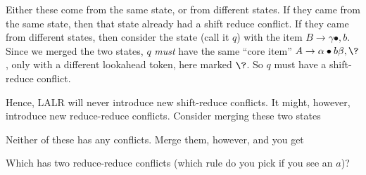 \begin{center}
\end{center}

Either these come from the same state, or from different states. If they came from the same state, then that state already had a shift reduce conflict. If they came from different states, then consider the state (call it $q$) with the item $B \to \gamma \bullet, b$. Since we merged the two states, $q$ \textit{must} have the same ``core item'' $A \to \alpha \bullet b \beta, \?$, only with a different lookahead token, here marked $\?$. So $q$ must have a shift-reduce conflict.

Hence, LALR will never introduce new shift-reduce conflicts. It might, however, introduce new reduce-reduce conflicts. Consider merging these two states
\begin{center}
\end{center}
Neither of these has any conflicts. Merge them, however, and you get
\begin{center}
\end{center}
Which has two reduce-reduce conflicts (which rule do you pick if you see an $a$)?

